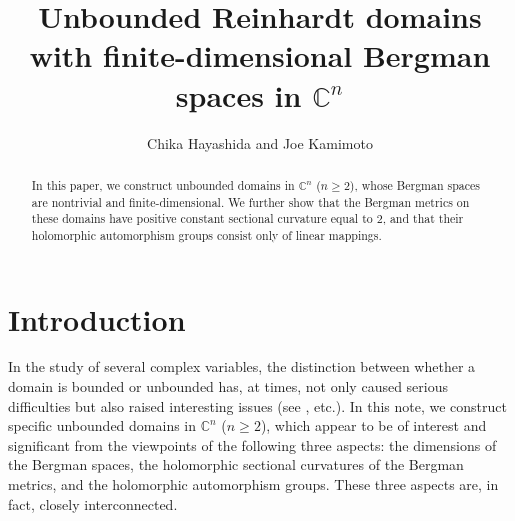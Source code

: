 \documentclass[12pt]{amsart}
\numberwithin{equation}{section}
\theoremstyle{definition}
\theoremstyle{remark}
\newcommand{\C}{{\mathbb C}}
\newcommand{\1}{{\bf 1}}
\begin{document}
\title[Unbounded Reinhardt domains]{
Unbounded Reinhardt domains with finite-dimensional Bergman spaces in $\C^n$}
\author{Chika Hayashida and Joe Kamimoto}

\address{Kyushu university, 
Motooka 744, Nishi-ku, 
Fukuoka, 819-0395, Japan.}  

\address{Kyushu university, 
Motooka 744, Nishi-ku, 
Fukuoka, 819-0395, Japan.}  
%
%
\maketitle

\begin{abstract}
In this paper, we construct unbounded domains 
in $\C^n$ ($n\geq 2$), 
whose Bergman spaces are nontrivial and 
finite-dimensional. 
We further show that 
the Bergman metrics on these domains 
have positive constant sectional curvature 
equal to $2$, and 
that  their holomorphic automorphism groups 
consist only of linear mappings. 
\end{abstract}


\section{Introduction}


In the study of several complex variables, 
the distinction between whether a domain is 
bounded or unbounded has, 
at times, 
not only caused serious difficulties but also 
raised interesting issues
(see 
\cite{Wie84,Zwo99, Zwo00,CKO04,Eng07,Juc12,KNY14,AGK16,
PfZ17, Yam17, GHH17, HST17, HST20, HST21, HLT25}, etc.).
In this note, we construct specific unbounded domains 
in %
$\C^n$ ($n\geq 2$), 
which appear to be of interest and significant 
from the viewpoints of the following three aspects:
the dimensions of the Bergman spaces, 
the holomorphic sectional curvatures of the Bergman metrics, 
and the holomorphic automorphism groups. 
These three aspects are, in fact,  
closely interconnected. 
\end{document}
